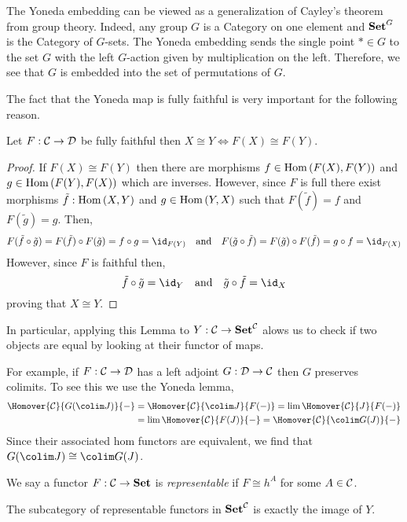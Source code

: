 \documentclass[12pt]{extarticle}
\begin{document}
\begin{rmk}
The Yoneda embedding can be viewed as a generalization of Cayley's theorem from group theory. Indeed, any group $G$ is a Category on one element and $\mathbf{Set}^G$ is the Category of $G$-sets. The Yoneda embedding sends the single point $* \in G$ to the set $G$ with the left $G$-action given by multiplication on the left. Therefore, we see that $G$ is embedded into the set of permutations of $G$. 
\end{rmk}

\begin{rmk}
The fact that the Yoneda map is fully faithful is very important for the following reason.
\end{rmk}

\begin{lemma}
Let $F : \mathcal{C} \to \mathcal{D}$ be fully faithful then $X \cong Y \iff F(X) \cong F(Y)$.
\end{lemma}

\begin{proof}
If $F(X) \cong F(Y)$ then there are morphisms $f \in \mathrm{Hom}\left( F(X), F(Y) \right)$ and $g \in \mathrm{Hom}\left( F(Y), F(X) \right)$ which are inverses. However, since $F$ is full there exist morphisms $\tilde{f} : \mathrm{Hom}\left( X, Y \right)$ and $g \in \mathrm{Hom}\left( Y, X \right)$ such that $F(\tilde{f}) = f$ and $F(\tilde{g}) = g$. Then,
\[ F(\tilde{f} \circ \tilde{g}) = F(\tilde{f}) \circ F(\tilde{g}) = f \circ g = \id_{F(Y)} \quad \text{and} \quad F(\tilde{g} \circ \tilde{f}) = F(\tilde{g}) \circ F(\tilde{f}) = g \circ f = \id_{F(X)} \]
However, since $F$ is faithful then,
\[ \tilde{f} \circ \tilde{g} = \id_Y \quad \text{and} \quad \tilde{g} \circ \tilde{f} = \id_X \]
proving that $X \cong Y$. 
\end{proof}

\begin{rmk}
In particular, applying this Lemma to $Y : \mathcal{C} \to \mathbf{Set}^{\mathcal{C}}$ alows us to check if two objects are equal by looking at their functor of maps.
\end{rmk}

\begin{example}
For example, if $F : \mathcal{C} \to \mathcal{D}$ has a left adjoint $G : \mathcal{D} \to \mathcal{C}$ then $G$ preserves colimits. To see this we use the Yoneda lemma,
\begin{align*}
\Homover{\C}{G(\colim J)}{-} & = \Homover{\C}{\colim J}{F(-)} = \lim \Homover{\C}{J}{F(-)} 
\\
& = \lim \Homover{\C}{F(J)}{-} = \Homover{\C}{\colim G(J)}{-} 
\end{align*}
Since their associated hom functors are equivalent, we find that $G(\colim J) \cong \colim G(J)$.
\end{example}

\begin{definition}
We say a functor $F : \mathcal{C} \to \mathbf{Set}$ is \textit{representable} if $F \cong h^A$ for some $A \in \mathcal{C}$. 
\end{definition}

\begin{rmk}
The subcategory of representable functors in $\mathbf{Set}^{\mathcal{C}}$ is exactly the image of $Y$.
\end{rmk}
\end{document}
